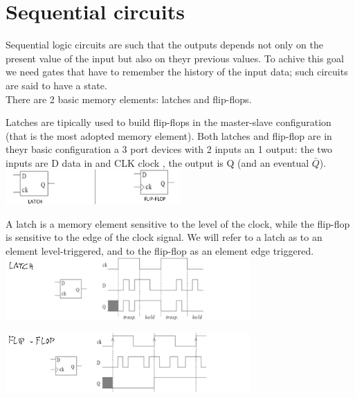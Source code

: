 \chapter{Sequential circuits}
Sequential logic circuits are such that the outputs depends not only on the present value of the input but also on theyr previous values.
To achive this goal we need gates that have to remember the history of the input data; such circuits are said to have a state.\\
There are 2 basic memory elements: latches and flip-flops.\\
	
\vspace{5mm}

Latches are tipically used to build flip-flops in the master-slave configuration (that is the most adopted memory element). Both latches and flip-flop are in theyr basic configuration a 3 port devices with 2 inputs an 1 output: the two inputs are D data in and CLK clock , the output is Q (and an eventual $\bar{Q}$).\\
\vspace{5mm}
\centering
\includegraphics[width=0.5\textwidth]{C10_1.png}\\
\raggedright
\vspace{7mm}

A latch is a memory element sensitive to the level of the clock, while the flip-flop is sensitive to the edge of the clock signal. We will refer to a latch as to an element level-triggered, and to the flip-flop as an element edge triggered.\\

\vspace{5mm}
\centering
\includegraphics[width=0.7\textwidth]{C10_2.png}\\
\raggedright

\centering
\includegraphics[width=0.7\textwidth]{C10_3.png}\\
\raggedright
\vspace{5mm}

